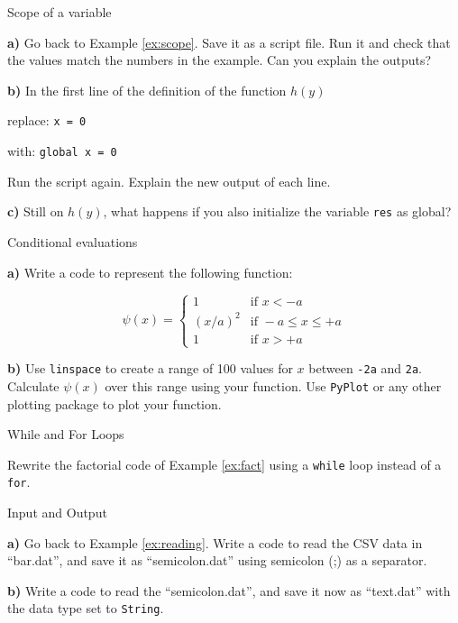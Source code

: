 \begin{problem}{Scope of a variable}
 \label{prob:scope}
 
 \textbf{a)} Go back to Example \ref{ex:scope}. Save it as a script file. Run it and check that the values match the numbers in the example. Can you explain the outputs?
 
 \textbf{b)} In the first line of the definition of the function $h(y)$
 
 replace: \texttt{x = 0}
 
 with: \texttt{global x = 0}
 
 Run the script again. Explain the new output of each line.
 
 \textbf{c)} Still on $h(y)$, what happens if you also initialize the variable \texttt{res} as global?
\end{problem}


\begin{problem}{Conditional evaluations}
 
 \textbf{a)} Write a code to represent the following function:
 
 \begin{equation}
  \psi(x) = 
  \begin{cases} 
   1       & \text{if } x < -a \\
   (x/a)^2     & \text{if } -a \leq x \leq +a \\
   1       & \text{if } x > +a
  \end{cases}
 \end{equation}

 \textbf{b)} Use \texttt{linspace} to create a range of 100 values for $x$ between \texttt{-2a} and \texttt{2a}. Calculate $\psi(x)$ over this range using your function. Use \texttt{PyPlot} or any other plotting package to plot your function.
\end{problem}



\begin{problem}{While and For Loops}
 
 Rewrite the factorial code of Example \ref{ex:fact} using a \texttt{while} loop instead of a \texttt{for}.
\end{problem}



\begin{problem}{Input and Output}
 \label{prob:readwritecsv}
 
 \textbf{a)} Go back to Example \ref{ex:reading}. Write a code to read the CSV data in ``bar.dat'', and save it as ``semicolon.dat'' using semicolon (;) as a separator.
 
 \textbf{b)} Write a code to read the ``semicolon.dat'', and save it now as ``text.dat'' with the data type set to \texttt{String}.
\end{problem}


